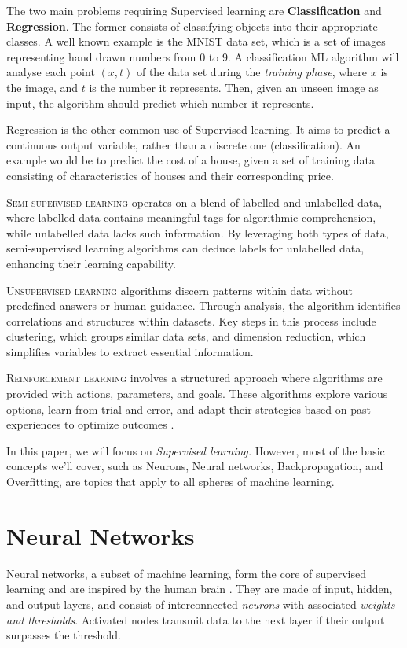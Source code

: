 \documentclass{article}
\begin{document}
  The two main problems requiring Supervised learning are \textbf{Classification} and \textbf{Regression}. The former consists of classifying objects into their appropriate classes. A well known example is the MNIST data set, which is a set of images representing hand drawn numbers from 0 to 9. A classification ML algorithm will analyse each point $(x,t)$ of the data set during the \textit{training phase}, where $x$ is the image, and $t$ is the number it represents. Then, given an unseen image as input, the algorithm should predict which number it represents.

  Regression is the other common use of Supervised learning. It aims to predict a continuous output variable, rather than a discrete one (classification). An example would be to predict the cost of a house, given a set of training data consisting of characteristics of houses and their corresponding price.


\vspace{4mm}
\noindent\textsc{Semi-supervised learning} operates on a blend of labelled and unlabelled data, where labelled data contains meaningful tags for algorithmic comprehension, while unlabelled data lacks such information. By leveraging both types of data, semi-supervised learning algorithms can deduce labels for unlabelled data, enhancing their learning capability. 


\vspace{4mm}
\noindent\textsc{Unsupervised learning} algorithms discern patterns within data without predefined answers or human guidance. Through analysis, the algorithm identifies correlations and structures within datasets. Key steps in this process include clustering, which groups similar data sets, and dimension reduction, which simplifies variables to extract essential information.


\vspace{4mm}
\noindent\textsc{Reinforcement learning} involves a structured approach where algorithms are provided with actions, parameters, and goals. These algorithms explore various options, learn from trial and error, and adapt their strategies based on past experiences to optimize outcomes \citep{GuideML}.

In this paper, we will focus on \textit{Supervised learning.} However, most of the basic concepts we'll cover, such as Neurons, Neural networks, Backpropagation, and Overfitting, are topics that apply to all spheres of machine learning. 

\section{Neural Networks}
Neural networks, a subset of machine learning, form the core of supervised learning and are inspired by the human brain \citep{web:IBM:NN}. They are made of input, hidden, and output layers, and consist of interconnected \textit{neurons} with associated \textit{weights and thresholds}. Activated nodes transmit data to the next layer if their output surpasses the threshold. 
\end{document}
